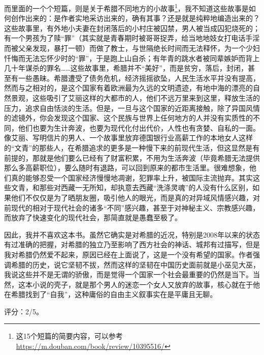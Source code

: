 而里面的一个个短篇，则是关于希腊不同地方的小故事\footnote{这15个短篇的简要内容，可以参考\url{https://m.douban.com/book/review/10395516/}}，我不知道这些故事是如何创作出来的：是作者实地采访出来的，确有其事？还是就是纯粹地编造出来的？这些故事里，有外地小夫妻在封闭落后的小村庄被囚禁，男人被当成囚犯烧死的；有一个男孩为了赎“罪”（其实就是青春期时被哥哥捉弄，给当地地妓女打电话手淫而被父亲发现，暴打一顿）而做了教士，与世隔绝长时间而无法释怀，为一个少妇忏悔而无法忘怀少时的“罪”，于是跑上山自杀；有年青的跳水者被同辈嫉妒而背上几十年谋杀的罪名……这些故事里，希腊并不“美好”，而是贫穷，落后，封闭，甚至有一些愚昧。希腊遭受了债务危机，经济摇摇欲坠，人民生活水平并没有提高，然而与之相对的，是这个国家有着欧洲最为久远的文明遗迹，有地中海的漂亮的自然景观，这些吸引了艾丽这样的大都市的人，他们不远万里来到这里，释放生活的压力，追求自由恬淡的生活。但是，一旦与这个国家的近距离接触，除了异国风情的滤镜外，你会发现这个国家、这个民族与世界上任何地方的人并没有实质性的不同，他们也要为生计奔波，也要为现代化付出代价，人性也有贪婪、自私的一面。像艾丽、写明信片的男人、一个故事里放弃德国银行业高薪工作的本地女人这样的“文青”的那些人，在希腊追求的更多是一种慢下来的前现代生活，但这显然是有前提的，那就是他们要么已经有了财富积累，不用为生活奔波（毕竟希腊无法提供那么多高薪职位），要么随时有退路，可以回到原来的都市生活里。很难想象，他们真的能够忍受一个国家经济慢慢地凋谢，犯罪率上升，被国际主流抛弃。其实这些文青，和那些对西藏一无所知，却执意去西藏“洗涤灵魂”的人没有什么区别，如果他们不仅仅是为了晒朋友圈，吸引他人的眼光，而是真的对异域风情感兴趣，对前现代的相对于现代社会的诸多“不同”感兴趣，甚至于对神秘主义、宗教感兴趣，而放弃了快速变化的现代社会，那简直就是愚蠢至极了。

因此，我并不喜欢这本书。虽然它确实是对希腊的近况，特别是2008年以来的状态有过准确的把握，对希腊的独立乃至影响了西方社会的神话、城邦有过描写，但是我对希腊仍然爱不起来，原因已经在上面说了，这是一个没有希望的国家。作者强调希腊的历史，说它坚韧不拔，然而这样的坚韧在中国历史面前就是小巫见大巫，我说这些并不是无谓的骄傲，而是觉得一个国家一个社会最重要的仍然是当下。当然，这本小说的壳子，就是那个男人的迷恋一个女人又放弃的故事，核心就在于他在希腊找到了“自我”，这种庸俗的自由主义叙事实在是平庸且无聊。

评分：2/5。